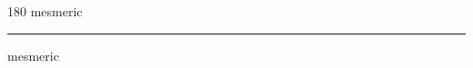
\begin{frame}
\begin{center}
\begin{turn}{180}
{\fontsize{2.5cm}{1em}\selectfont mesmeric}
\end{turn}
\vspace{1em}\par  
\hrule
\vspace{1em}\par  
{\fontsize{2.5cm}{1em}\selectfont mesmeric}
\end{center}
\end{frame}

